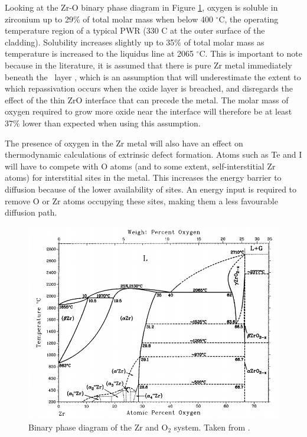 Looking at the Zr-O binary phase diagram in Figure \ref{figure:binary_phase_diagram}, oxygen is soluble in zirconium up to 29\% of total molar mass when below 400 $^{\circ}$C, the operating temperature region of a typical PWR (330 \textdegree C at the outer surface of the cladding). Solubility increases slightly up to 35\% of total molar mass as temperature is increased to the liquidus line at 2065 $^{\circ}$C. This is important to note because in the literature, it is assumed that there is pure Zr metal immediately beneath the \zirconia\ layer \cite{rossi2015first}, which is an assumption that will underestimate the extent to which repassivation occurs when the oxide layer is breached, and disregards the effect of the thin ZrO interface that can precede the metal. The molar mass of oxygen required to grow more oxide near the interface will therefore be at least 37\% lower than expected when using this assumption.

The presence of oxygen in the Zr metal will also have an effect on thermodynamic calculations of extrinsic defect formation. Atoms such as Te and I will have to compete with O atoms (and to some extent, self-interstitial Zr atoms) for interstitial sites in the metal. This increases the energy barrier to diffusion because of the lower availability of sites. An energy input is required to remove O or Zr atoms occupying these sites, making them a less favourable diffusion path.


\begin{figure}[ht]
\centering
\includegraphics[width=14cm]{images/zro2_binary_phase.png}
\caption[Binary phase diagram of the Zr and O$_{2}$ system.]{Binary phase diagram of the Zr and O$_{2}$ system. Taken from \cite{Abriata1986}.}
\label{figure:binary_phase_diagram}
\end{figure}

